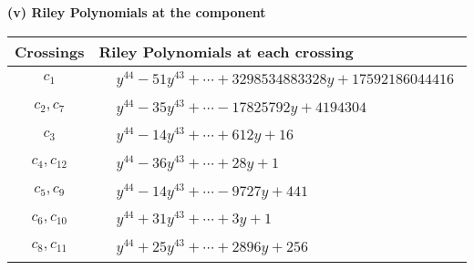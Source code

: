 \documentclass[1p]{elsarticle_modified}
\theoremstyle{definition}
\begin{document}
\flushleft \textbf{(v) Riley Polynomials at the component}\newline \\
\begin{tabular}{m{50pt}|m{274pt}}
Crossings & \hspace{64pt}Riley Polynomials at each crossing \\
\hline $$\begin{aligned}c_{1}\end{aligned}$$&$\begin{aligned}
&y^{44}-51 y^{43}+\cdots+3298534883328 y+17592186044416
\end{aligned}$\\
\hline $$\begin{aligned}c_{2},c_{7}\end{aligned}$$&$\begin{aligned}
&y^{44}-35 y^{43}+\cdots-17825792 y+4194304
\end{aligned}$\\
\hline $$\begin{aligned}c_{3}\end{aligned}$$&$\begin{aligned}
&y^{44}-14 y^{43}+\cdots+612 y+16
\end{aligned}$\\
\hline $$\begin{aligned}c_{4},c_{12}\end{aligned}$$&$\begin{aligned}
&y^{44}-36 y^{43}+\cdots+28 y+1
\end{aligned}$\\
\hline $$\begin{aligned}c_{5},c_{9}\end{aligned}$$&$\begin{aligned}
&y^{44}-14 y^{43}+\cdots-9727 y+441
\end{aligned}$\\
\hline $$\begin{aligned}c_{6},c_{10}\end{aligned}$$&$\begin{aligned}
&y^{44}+31 y^{43}+\cdots+3 y+1
\end{aligned}$\\
\hline $$\begin{aligned}c_{8},c_{11}\end{aligned}$$&$\begin{aligned}
&y^{44}+25 y^{43}+\cdots+2896 y+256
\end{aligned}$\\
\hline
\end{tabular}\\~\\
\end{document}
